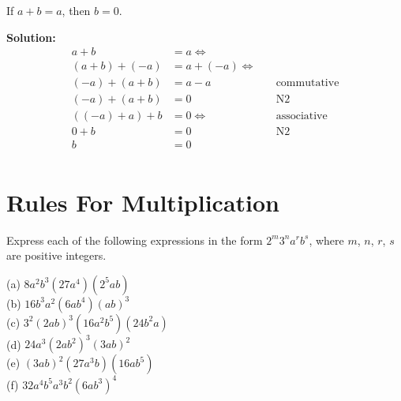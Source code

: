 \documentclass[6pt]{article}
\begin{document}
\begin{tcolorbox}[title=23 Prove, breakable]
If $a + b = a$, then $b = 0$.
\end{tcolorbox}

\textbf{Solution:}
\begin{align*}
a + b &= a \Leftrightarrow & \quad \text{} \\
(a + b) + (-a) &= a + (-a) \Leftrightarrow & \quad \text{} \\
(-a) + (a + b) &= a - a & \quad \text{commutative} \\ 
(-a) + (a + b) &= 0 & \quad \text{N2}  \\
((-a) + a) + b &= 0 \Leftrightarrow & \quad \text{associative}  \\ 
0 + b &= 0  & \quad \text{N2}  \\
b &= 0 & \\
\end{align*}

\section{Rules For Multiplication}

Express each of the following expressions in the form $2^m 3^n a^r b^s$, where $m$,
$n$, $r$, $s$ are positive integers.
\begin{tcolorbox}[title=Problem 1, breakable]
(a) $8 a^2 b^3 (27 a^4) (2^5 a b)$ \\
(b) $16 b^3 a^2 (6 a b^4) {(a b)}^3$ \\
(c) $3^2 {(2 a b)}^3 (16 a^2 b^5) (24 b^2 a)$ \\
(d) $24 a^3 {(2 a b^2)}^3 {(3 a b)}^2$ \\
(e) ${(3 a b)}^2 (27 a^3 b) (16 a b^5)$ \\
(f) $32 a^4 b^5 a^3 b^2 {(6 a b^3)}^4$ \\
\end{tcolorbox}
\end{document}

